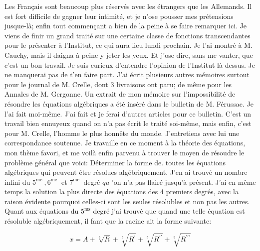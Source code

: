 \documentclass{article}
\begin{document}
Les Français sont beaucoup plus réservés avec les étrangers que les Allemands. Il est fort difficile de gagner leur intimité, et je n'ose pousser mes prétensions jusque-là; enfin tout commençant a bien de la peine à se
faire remarquer ici. Je viens de finir un grand traité sur une certaine classe de fonctions transcendantes pour le présenter à l'Institut, ce qui aura lieu lundi prochain. Je l'ai montré à M. Cauchy, mais il daigna à peine y jeter les yeux. Et j'ose dire, sans me vanter, que c'est un bon travail. Je suis curieux d'entendre l'opinion de l'Institut là-dessus. Je ne manquerai pas de t'en faire part. J'ai écrit plusieurs autres mémoires surtout pour le journal de M. Crelle, dont 3 livraisons ont paru; de même pour les Annales de M. Gergonne. Un extrait de mon mémoire sur l'impossibilité de résondre les équations algébriques a été inséré dans le bulletin de M. Férussac. Je l'ai fait moi-même. J'ai fait et je ferai d'autres articles pour ce bulletin. C'est un travail bien ennuyeux quand on n'a pas écrit le traité soi-même, mais enfin, c'est pour M. Crelle, l'homme le plus honnête du monde. J'entretiens avec lui une correspondance soutenue. Je travaille en ce moment à la théorie des équations, mon thème favori, et me voilà enfin parvenu à trouver le moyen de résoudre le problème général que voici: Déterminer la forme de. toutes les équations algébriques qui peuvent être résolues algébriquement. J'en ai trouvé un nombre infini du \(5^{\text {me }}, 6^{\text {me }}\) et \(7^{\text {me }}\) degré \(q u\) 'on n'a pas flairé jusqu'à présent. J'ai en même temps la solution la plus directe des équations des 4 premiers degrés, avec la raison évidente pourquoi celles-ci sont les seules résolubles et non pas les autres. Quant aux équations du \(5^{\mathrm{ms}}\) degré j'ai trouvé que quand une telle équation est résoluble algébriquement, il fant que la racine ait la forme suivante:

\[
x=A+\sqrt[5]{R}+\sqrt[5]{R^{\prime}}+\sqrt[5]{R^{\prime \prime}}+\sqrt[5]{R^{\prime \prime \prime}}
\]
\end{document}
